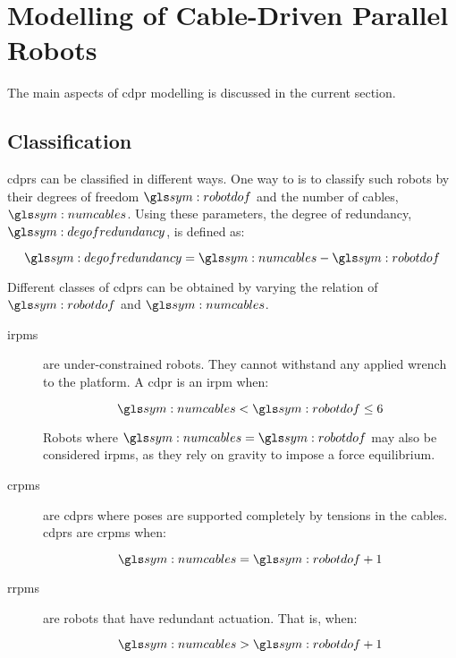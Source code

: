 \section{Modelling of Cable-Driven Parallel Robots}%
\label{sec:modelling_of_cable_driven_parallel_robots}

	The main aspects  of  \gls{cdpr}  modelling  is  discussed	in	the  current
	section.  

    \subsection{ Classification}%
    \label{sec:cdpr_classification}

		\glspl{cdpr} can be classified in different ways.	One  way  to  is  to
		classify such robots by their degrees of  freedom  $\robotdof$	and  the
		number of cables, $\numcables$.  Using these parameters, the  degree  of
        redundancy, $\degofredundancy$, is defined as:

        \begin{equation}
            \degofredundancy = \numcables - \robotdof
        \end{equation}

		Different classes  of  \glspl{cdpr}  can  be  obtained	by	varying  the
        relation of $\robotdof$ and $\numcables$.

        \begin{description}

            \item[\glspl{irpm}]

				are under-constrained robots.  They cannot withstand any applied
				wrench to the platform.  A \gls{cdpr}  is  an  \gls{irpm}  when:

                \begin{equation}
                    \numcables < \robotdof \leq 6
                \end{equation}

				Robots where $\numcables = \robotdof$  may	also  be  considered
				\glspl{irpm},  as  they  rely  on  gravity	to	impose	a  force
                equilibrium.

            \item[\glspl{crpm}]

				are  \glspl{cdpr}  where  poses  are  supported  completely   by
				tensions in the cables.   \glspl{cdpr}	are  \glspl{crpm}  when:

                \begin{equation}
                    \numcables = \robotdof + 1
                \end{equation}

            \item[\glspl{rrpm}]

				are robots	that  have	redundant  actuation.	That  is,  when:

                \begin{equation}
                    \numcables > \robotdof + 1
                \end{equation}
        \end{description}

